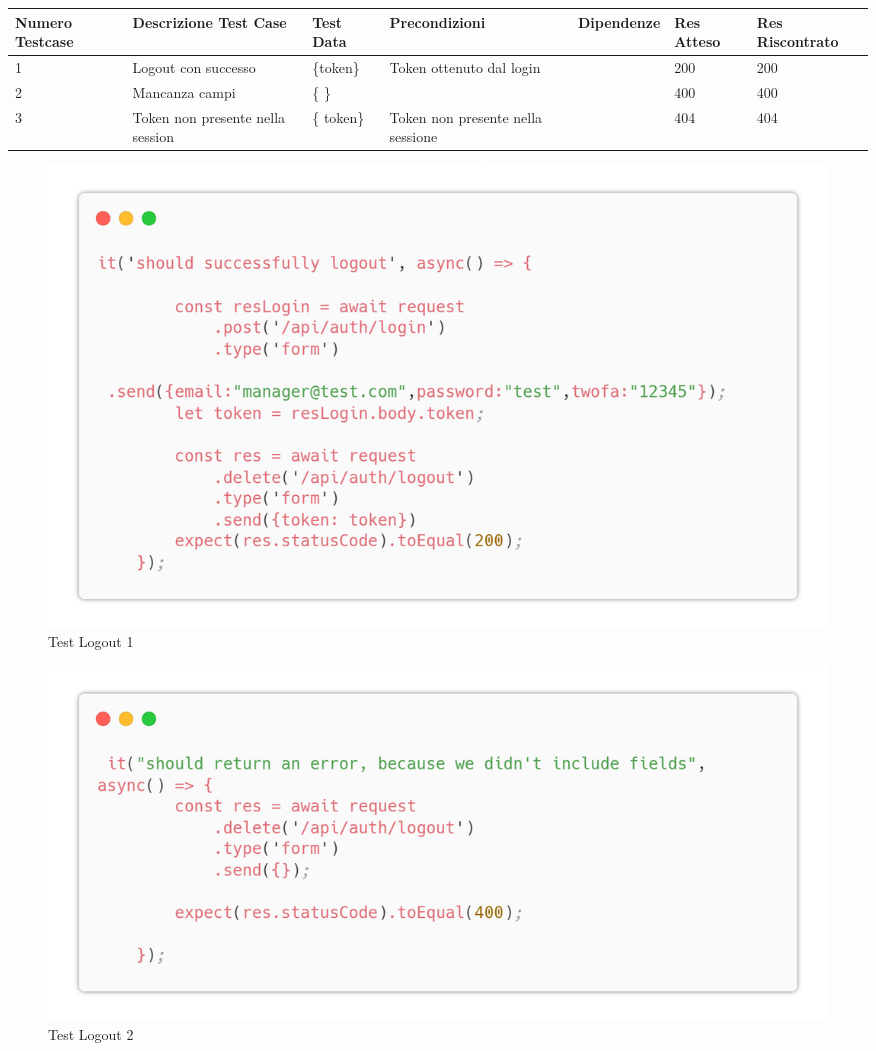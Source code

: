 \documentclass{report}
\begin{document}
\begin{center} %
	\centering
	\begin{tabular}{ |p{1cm}|p{2cm}|p{2cm}|p{2cm}|p{2cm}|p{1cm}|p{1cm}| }
		\hline
		Numero Testcase & Descrizione Test Case            & Test Data  & Precondizioni                     & Dipendenze & Res Atteso & Res Riscontrato \\
		\hline
		1               & Logout con successo              & \{token\}  & Token ottenuto dal login          &            & 200        & 200             \\
		\hline
		2               & Mancanza campi                   & \{ \}      &                                   &            & 400        & 400             \\
		\hline
		3               & Token non presente nella session & \{ token\} & Token non presente nella sessione &            & 404        & 404             \\
		\hline
	\end{tabular}
\end{center}
\begin{figure}[H]
	\centering\includegraphics[width=1\textwidth]{images/microservizio-autenticazione/tests/logout_test_1.png}
	\caption{Test Logout 1}
\end{figure}
\begin{figure}[H]
	\centering\includegraphics[width=1\textwidth]{images/microservizio-autenticazione/tests/logout_test_2.png}
	\caption{Test Logout 2}
\end{figure}
\end{document}
